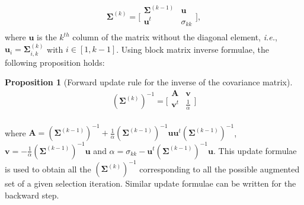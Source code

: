 \documentclass[journal]{IEEEtran}
\newtheorem{prop}{Proposition}
\begin{document}
        \begin{equation}\label{eq:cov}
            \boldsymbol{\Sigma}^{(k)} =
            \bigg[\begin{array}{cc}
            \boldsymbol{\Sigma}^{(k-1)} & \mathbf{u}      \\
            \mathbf{u}^t          & \sigma_{kk} \\
            \end{array}\bigg],
        \end{equation}
        where  $\mathbf{u}$  is  the  $k^{th}$ column  of  the  matrix
        without      the      diagonal      element,      \emph{i.e.},
        $\mathbf{u}_{i}   =    \boldsymbol{\Sigma}^{(k)}_{i,k}$   with
        $i  \in [1,k-1]$.  Using  block matrix  inverse formulae,  the
        following proposition holds:
        \begin{prop}[Forward update rule for the inverse of the covariance matrix]
        \label{eq:update-inv}
        \begin{equation}\label{eq:cov:inv}
                (\boldsymbol{\Sigma}^{(k)})^{-1} =
                \bigg[\begin{array}{cc}
                \mathbf{A} & \mathbf{v} \\
                \mathbf{v}^t  & \frac{1}{\alpha} \\
                \end{array}\bigg]
            \end{equation}
        \end{prop}
        \noindent                                                where
        $\mathbf{A}     =     (\boldsymbol{\Sigma}^{(k-1)})^{-1}     +
        \frac{1}{\alpha} (\boldsymbol{\Sigma}^{(k-1)})^{-1} \mathbf{u}
        \mathbf{u}^t              (\boldsymbol{\Sigma}^{(k-1)})^{-1}$,
        $\mathbf{v}           =           -           \frac{1}{\alpha}
        (\boldsymbol{\Sigma}^{(k-1)})^{-1}       \mathbf{u}$       and
        $      \alpha      =      \sigma_{kk}      -      \mathbf{u}^t
        (\boldsymbol{\Sigma}^{(k-1)})^{-1}  \mathbf{u}$.  This  update
        formulae      is     used      to      obtain     all      the
        $(\boldsymbol{\Sigma}^{(k)})^{-1}$  corresponding  to all  the
        possible augmented set of a given selection iteration. Similar
        update formulae can be written for the backward step.
\end{document}
